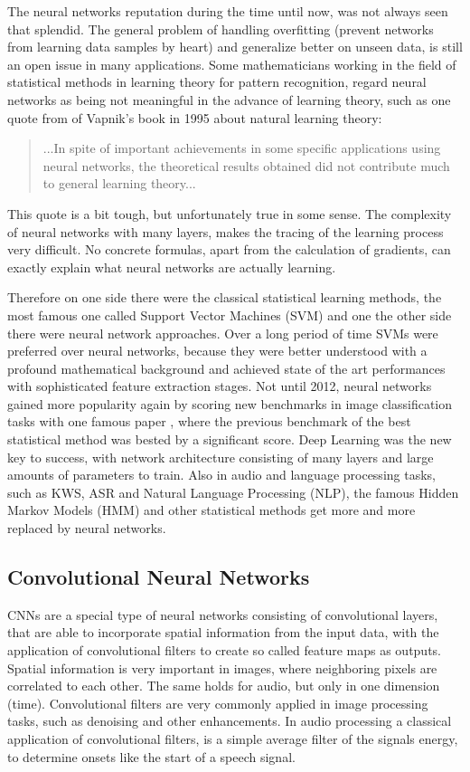 The neural networks reputation during the time until now, was not always seen that splendid.
The general problem of handling overfitting (prevent networks from learning data samples by heart) and generalize better on unseen data, is still an open issue in many applications.
Some mathematicians working in the field of statistical methods in learning theory for pattern recognition, regard neural networks as being not meaningful in the advance of learning theory, such as one quote from \cite{Vapnik1995} of Vapnik's book in 1995 about natural learning theory:

\begin{quote}
...In spite of important achievements in some specific applications using neural networks, the theoretical results obtained did not contribute much to general learning theory...
\end{quote}

This quote is a bit tough, but unfortunately true in some sense. 
The complexity of neural networks with many layers, makes the tracing of the learning process very difficult.
No concrete formulas, apart from the calculation of gradients, can exactly explain what neural networks are actually learning.

Therefore on one side there were the classical statistical learning methods, the most famous one called Support Vector Machines (SVM) \cite{Cortes1995} and one the other side there were neural network approaches.
Over a long period of time SVMs were preferred over neural networks, because they were better understood with a profound mathematical background and achieved state of the art performances with sophisticated feature extraction stages.
Not until 2012, neural networks gained more popularity again by scoring new benchmarks in image classification tasks with one famous paper \cite{Krizhevsky2012}, where the previous benchmark of the best statistical method was bested by a significant score.
Deep Learning was the new key to success, with network architecture consisting of many layers and large amounts of parameters to train.
Also in audio and language processing tasks, such as KWS, ASR and Natural Language Processing (NLP), the famous Hidden Markov Models (HMM) and other statistical methods get more and more replaced by neural networks.



\subsection{Convolutional Neural Networks}\label{sec:prev_nn_cnn}
CNNs are a special type of neural networks consisting of convolutional layers, that are able to incorporate spatial information from the input data, with the application of convolutional filters to create so called feature maps as outputs.
Spatial information is very important in images, where neighboring pixels are correlated to each other.
The same holds for audio, but only in one dimension (time).
Convolutional filters are very commonly applied in image processing tasks, such as denoising and other enhancements.
In audio processing a classical application of convolutional filters, is a simple average filter of the signals energy, to determine onsets like the start of a speech signal.

